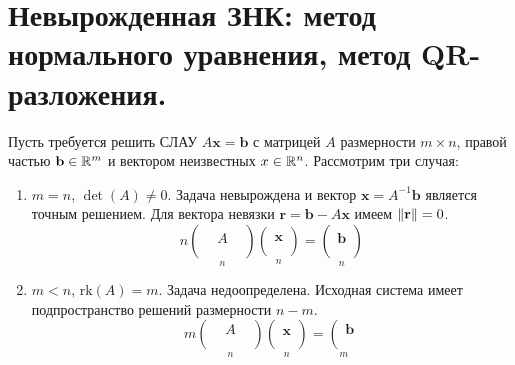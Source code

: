 \section{Невырожденная ЗНК: метод нормального уравнения, метод QR-разложения.}

Пусть требуется решить СЛАУ $A\mathbf{x}=\mathbf{b}$ с матрицей $A$
размерности $m\times n$, правой частью $\mathbf{b}\in\mathbb{R}^m$ и вектором
неизвестных $x\in\mathbb{R}^n$. Рассмотрим три случая:
\begin{enumerate}
  \item $m = n$, $\det(A)\neq0$.
        Задача невырождена и вектор $\mathbf{x}=A^{-1}\mathbf{b}$ является точным решением.
        Для вектора невязки $\mathbf{r}=\mathbf{b}-A\mathbf{x}$ имеем $\left\lVert\mathbf{r}\right\rVert=0$.
        \[n\underset{n}{\left(\begin{array}{ccc}
               &   & \\
               & A & \\
               &   & \\
            \end{array}\right)}\underset{n}{\left(\begin{array}{c}
              \\ \mathbf{x} \\ \\
            \end{array}\right)}=\underset{n}{\left(\begin{array}{c}
              \\ \mathbf{b} \\ \\
            \end{array}\right)}\]
  \item $m < n$, $\text{rk}(A)=m$.
        Задача недоопределена. Исходная система имеет подпространство решений размерности $n-m$.
        \[m\underset{n}{\left(\begin{array}{ccc}
               & A & \\
               &   & \\
            \end{array}\right)}\underset{n}{\left(\begin{array}{c}
              \\ \mathbf{x} \\ \\
            \end{array}\right)}=\underset{m}{\left(\begin{array}{c}
              \mathbf{b} \\  \\

\end{array}}\]
\end{enumerate}
